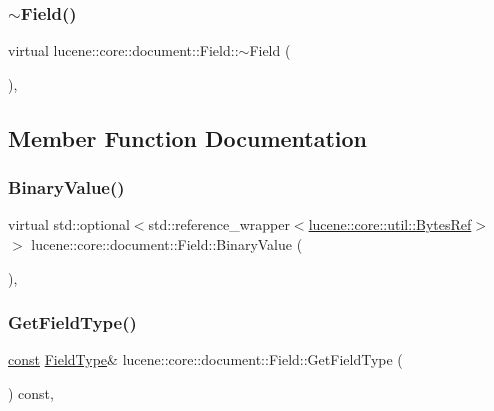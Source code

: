 \subsubsection{\texorpdfstring{$\sim$\+Field()}{~Field()}}
{\footnotesize\ttfamily virtual lucene\+::core\+::document\+::\+Field\+::$\sim$\+Field (\begin{DoxyParamCaption}{ }\end{DoxyParamCaption})\hspace{0.3cm}{\ttfamily [inline]}, {\ttfamily [virtual]}}



\subsection{Member Function Documentation}
\mbox{\label{classlucene_1_1core_1_1document_1_1Field_adf4cc37537f8889dda2469c22481193b}} 
\subsubsection{\texorpdfstring{Binary\+Value()}{BinaryValue()}}
{\footnotesize\ttfamily virtual std\+::optional$<$std\+::reference\+\_\+wrapper$<$\mbox{\hyperlink{classlucene_1_1core_1_1util_1_1BytesRef}{lucene\+::core\+::util\+::\+Bytes\+Ref}}$>$ $>$ lucene\+::core\+::document\+::\+Field\+::\+Binary\+Value (\begin{DoxyParamCaption}{ }\end{DoxyParamCaption})\hspace{0.3cm}{\ttfamily [inline]}, {\ttfamily [virtual]}}

\mbox{\label{classlucene_1_1core_1_1document_1_1Field_a06bffb93596bfbe170e795279d30ae4f}} 
\subsubsection{\texorpdfstring{Get\+Field\+Type()}{GetFieldType()}}
{\footnotesize\ttfamily \mbox{\hyperlink{ZlibCrc32_8h_a2c212835823e3c54a8ab6d95c652660e}{const}} \mbox{\hyperlink{classlucene_1_1core_1_1document_1_1FieldType}{Field\+Type}}\& lucene\+::core\+::document\+::\+Field\+::\+Get\+Field\+Type (\begin{DoxyParamCaption}{ }\end{DoxyParamCaption}) const\hspace{0.3cm}{\ttfamily [inline]}, {\ttfamily [noexcept]}}

